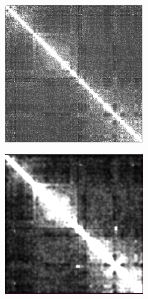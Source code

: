 \documentclass{article}
\begin{document}
\begin{figure}[H]
\begin{subfigure}[b]{.3\textwidth}
        \caption{}
        \label{fig:scn+pearson}
    \end{subfigure}
    \begin{subfigure}[b]{.3\textwidth}
        \includegraphics[width=\textwidth]{figures/pearson+scn.png}
        \caption{}
        \label{fig:pearson+scn}
    \end{subfigure}
    \begin{subfigure}[b]{.3\textwidth}
        \includegraphics[width=\textwidth]{figures/pyr.png}

\end{subfigure}
\end{figure}
\end{document}
